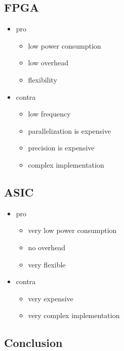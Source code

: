 \documentclass[mscthesis]{usiinfthesis}
\begin{document}
\subsection{FPGA}
\begin{itemize}
    \item pro
    \begin{itemize}
        \item low power consumption
        \item low overhead
        \item flexibility
    \end{itemize}
    \item contra
    \begin{itemize}
        \item low frequency
        \item parallelization is expensive
        \item precision is expensive
        \item complex implementation
    \end{itemize}
\end{itemize}

\subsection{ASIC}
\begin{itemize}
    \item pro
    \begin{itemize}
        \item very low power consumption
        \item no overhead
        \item very flexible
    \end{itemize}
    \item contra
    \begin{itemize}
        \item very expensive
        \item very complex implementation
    \end{itemize}
\end{itemize}

\subsection{Conclusion}

\end{document}

